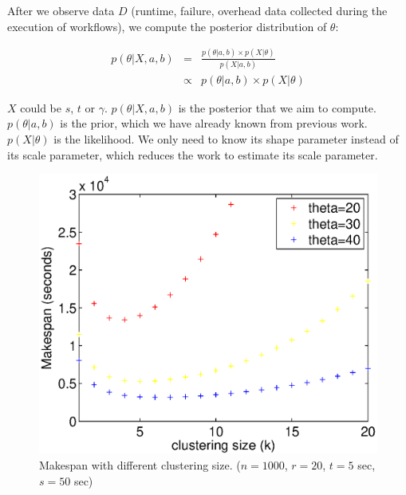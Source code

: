 \documentclass{IOS-Book-Article}
\begin{document}
After we observe data $D$ (runtime, failure, overhead data collected during the execution of workflows), we compute the posterior distribution of $\theta$:

\begin{eqnarray}
	\displaystyle  
	p(\theta|X, a, b)&=&\frac{p(\theta|a, b)\times p(X|\theta)}{p(X|a, b)}\nonumber  \\
	&\propto&p(\theta|a, b)\times p(X|\theta)\nonumber 
\end{eqnarray}

$X$ could be $s$, $t$ or $\gamma$. $p(\theta|X,a, b)$ is the posterior that we aim to compute. $p(\theta|a, b)$ is the prior, which we have already known from previous work. $p(X|\theta)$ is the likelihood. We only need to know its shape parameter instead of its scale parameter, which reduces the work to estimate its scale parameter. 

\begin{figure}[!htb]
\centering
  \includegraphics[width=0.95\linewidth]{figure5.eps}
  \caption{Makespan with different clustering size. ($n=1000$, $r=20$, $t=5$ sec, $s=50$ sec)}
  \label{fig:model_makespan}
\end{figure}
\end{document}
